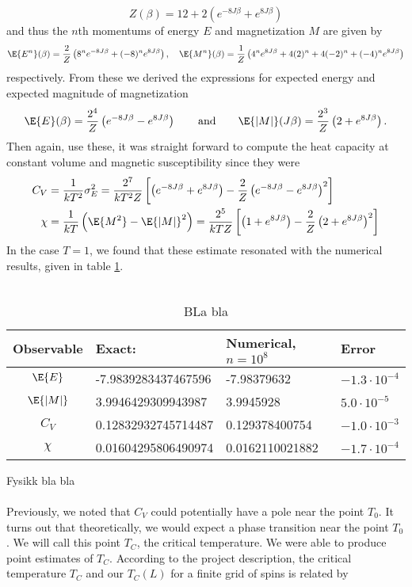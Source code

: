 \documentclass[11pt,english,a4paper]{article}
\begin{document}
\[
Z(\beta) = 12 + 2\left( e^{ -8 J\beta} + e^{ 8 J\beta} \right)
\]
and thus the $n$th momentums of energy $E$ and magnetization $M$ are given by
\[
\E{E^n}(\beta) = \frac{2}{Z}\left( 8^n e^{ -8 J\beta} + (-8)^n e^{ 8 J\beta}  \right), \quad \E{M^n}(\beta) = \frac{1}{Z}\left( 4^n e^{ 8 J\beta} + 4(2)^n + 4(-2)^n + (-4)^n e^{ 8 J\beta}  \right)
\]
respectively. From these we derived the expressions for expected energy and expected magnitude of magnetization 
\[
\E{E}(\beta) = \frac{2^4}{Z}\left( e^{ -8 J\beta} - e^{ 8 J\beta}  \right) \qquad \text{and} \qquad \E{|M|}(J\beta) = \frac{2^3}{Z}\left(  2 + e^{ 8 J\beta} \right).
\]
Then again, use these, it was straight forward to compute the heat capacity at constant volume and magnetic susceptibility since they were
\begin{align*}
C_V &= \frac{1}{kT^2}\sigma_E^2 = \frac{2^7}{kT^2Z}\left[  \left( e^{ -8J\beta} + e^{ 8J\beta} \right) - \frac{2}{Z}\left( e^{ -8J\beta} - e^{ 8J\beta} \right)^2  \right] \\
\chi &= \frac{1}{kT} \left(\E{M^2} -\E{|M|}^2 \right) = \frac{2^5}{kTZ} \left[ \left( 1 + e^{ 8J \beta} \right) - \frac{2}{Z}\left( 2 + e^{ 8J \beta} \right)^2 \right]
\end{align*}
In the case $T=1$, we found that these estimate resonated with the numerical results, given in table \ref{tab:errors}.\\
\\
\begin{table}[!h]
\center
\begin{tabular}{c l l l}
Observable&Exact:					& Numerical, $n = 10^8$& Error\\
\hline
$\E{E}$ & -7.9839283437467596		& -7.98379632& $-1.3\cdot 10^{-4}$\\
$\E{|M|}$ & 3.9946429309943987		& 3.9945928& $5.0\cdot 10^{-5}$\\
$C_V$ & 0.12832932745714487	& 0.129378400754& $-1.0\cdot 10^{-3}$\\
$\chi$ & 0.01604295806490974		& 0.0162110021882& $-1.7\cdot 10^{-4}$
\end{tabular}
\caption{BLa bla} \label{tab:errors}
\end{table}%
Fysikk bla bla\\
\\
Previously, we noted that $C_V$ could potentially have a pole near the point $T_0$. It turns out that theoretically, we would expect a phase transition near the point $T_0$. We will call this point $T_C$, the critical temperature. We were able to produce point estimates of $T_C$. According to the project description, the critical temperature $T_C$ and our $T_C(L)$ for a finite grid of spins is related by
\end{document}
